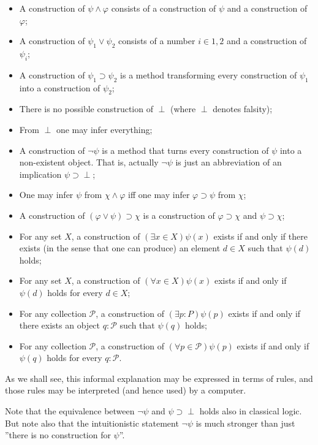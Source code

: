 \begin{itemize}
\item A construction of $\psi\wedge\varphi$ consists of a construction of $\psi$
  and a construction of $\varphi$;
\item A construction of $\psi_{1} \vee \psi_{2}$ consists of a number
  $i \in {1, 2}$ and a construction of $\psi_{i}$;
\item A construction of $\psi_{1} \supset \psi_{2}$ is a method transforming
  every construction of $\psi_{1}$ into a construction of $\psi_{2}$;
\item There is no possible construction of $\perp$ (where $\perp$ denotes
  falsity);
\item From $\perp$ one may infer everything;
\item A construction of $\neg\psi$ is a method that turns every construction of
  $\psi$ into a non-existent object. That is, actually $\neg\psi$ is just an
  abbreviation of an implication $\psi \supset \perp$;
\item One may infer $\psi$ from $\chi\wedge\varphi$ iff one may infer
  $\varphi \supset \psi$ from $\chi$;
\item A construction of $(\varphi \vee \psi) \supset \chi$ is a construction of
  $\varphi \supset \chi$ and $\psi \supset \chi$;
\item For any set $X$, a construction of $(\exists x \in X)\psi(x)$ exists if
  and only if there exists (in the sense that one can produce) an element
  $d \in X$ such that $\psi(d)$ holds;
\item For any set $X$, a construction of $(\forall x \in X)\psi(x)$ exists if
  and only if $\psi(d)$ holds for every $d \in X$;
\item For any collection $\mathcal{P}$, a construction of
  $(\exists p : P)\psi(p)$ exists if and only if there exists an object
  $q : \mathcal{P}$ such that $\psi(q)$ holds;
\item For any collection $\mathcal{P}$, a construction of
  $(\forall p \in \mathcal{P})\psi(p)$ exists if and only if $\psi(q)$ holds for
  every $q : \mathcal{P}$.
\end{itemize}

As we shall see, this informal explanation may be expressed in terms of rules,
and those rules may be interpreted (and hence used) by a computer.

Note that the equivalence between $\neg\psi$ and $\psi\supset\perp$ holds also
in classical logic. But note also that the intuitionistic statement $\neg\psi$
is much stronger than just ''there is no construction for $\psi$''.

